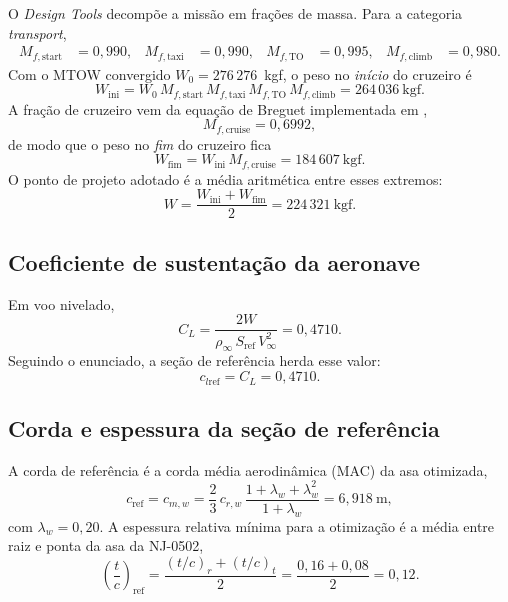 O \emph{Design Tools} decompõe a missão em frações de massa. Para a
categoria \emph{transport},
\begin{equation}
\begin{aligned}
M_{f,\mathrm{start}} &= 0{,}990,&
M_{f,\mathrm{taxi}} &= 0{,}990,&
M_{f,\mathrm{TO}} &= 0{,}995,&
M_{f,\mathrm{climb}} &= 0{,}980.
\end{aligned}
\end{equation}
Com o MTOW convergido $W_0 = 276\,276$~kgf, o peso no \emph{início} do
cruzeiro é
\begin{equation}
W_{\mathrm{ini}}
= W_0\,M_{f,\mathrm{start}}\,M_{f,\mathrm{taxi}}\,M_{f,\mathrm{TO}}\,M_{f,\mathrm{climb}}
= 264\,036~\mathrm{kgf}.
\end{equation}
A fração de cruzeiro vem da equação de Breguet implementada em
,
\begin{equation}
M_{f,\mathrm{cruise}} = 0{,}6992,
\end{equation}
de modo que o peso no \emph{fim} do cruzeiro fica
\begin{equation}
W_{\mathrm{fim}} = W_{\mathrm{ini}}\,M_{f,\mathrm{cruise}}
= 184\,607~\mathrm{kgf}.
\end{equation}
O ponto de projeto adotado é a média aritmética entre esses extremos:
\begin{equation}
W
= \frac{W_{\mathrm{ini}} + W_{\mathrm{fim}}}{2}
= 224\,321~\mathrm{kgf}.
\end{equation}

\subsection{Coeficiente de sustentação da aeronave}

Em voo nivelado,
\begin{equation}
C_L
= \frac{2W}{\rho_{\infty}\,S_{\mathrm{ref}}\,V_{\infty}^{2}}
= 0{,}4710.
\end{equation}
Seguindo o enunciado, a seção de referência herda esse valor:
\begin{equation}
c_{l\mathrm{ref}} = C_L = 0{,}4710.
\end{equation}

\subsection{Corda e espessura da seção de referência}

A corda de referência é a corda média aerodinâmica (MAC) da asa
otimizada,
\begin{equation}
c_{\mathrm{ref}} = c_{m,w}
= \frac{2}{3}\,c_{r,w}\,\frac{1+\lambda_w+\lambda_w^{2}}{1+\lambda_w}
= 6{,}918~\mathrm{m},
\end{equation}
com $\lambda_w = 0{,}20$. A espessura relativa mínima para a otimização
é a média entre raiz e ponta da asa da NJ-0502,
\begin{equation}
\left(\frac{t}{c}\right)_{\mathrm{ref}}
= \frac{(t/c)_{r} + (t/c)_{t}}{2}
= \frac{0{,}16 + 0{,}08}{2}
= 0{,}12.
\end{equation}

